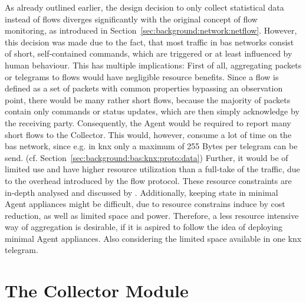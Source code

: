 As already outlined earlier, the design decision to only collect statistical data instead of flows diverges significantly with the original concept of flow monitoring, as introduced in Section~\ref{sec:background:network:netflow}.
However, this decision was made due to the fact, that most traffic in \gls{bas} networks consist of short, self-contained commands, which are triggered or at least influenced by human behaviour. This has multiple implications:
First of all, aggregating packets or telegrams to flows would have negligible resource benefits. Since a flow is defined as a set of packets with common properties bypassing an observation point, there would be many rather short flows, because the majority of packets contain only commands or status updates, which are then simply acknowledge by the receiving party. \parencite[cf.][]{Claise2013}
Consequently, the Agent would be required to report many short flows to the Collector. This would, however, consume a lot of time on the \gls{bas} network, since e.g. in \gls{knx} only a maximum of 255 Bytes per telegram can be send. (cf. Section~\ref{sec:background:bas:knx:proto:data})
Further, it would be of limited use and have higher resource utilization than a full-take of the traffic, due to the overhead introduced by the flow protocol. These resource constraints are in-depth analysed and discussed by \textcite{Jung2018}.
Additionally, keeping state in minimal Agent appliances might be difficult, due to resource constrains induce by cost reduction, as well as limited space and power.
Therefore, a less resource intensive way of aggregation is desirable, if it is aspired to follow the idea of deploying minimal Agent appliances.
Also considering the limited space available in one \gls{knx} telegram.

\section{The Collector Module}
\label{sec:concept:collector}

